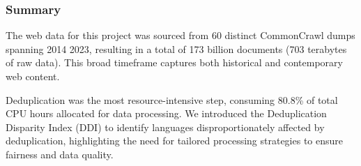 
\subsubsection{Summary} 
The web data for this project was sourced from 60 distinct CommonCrawl dumps spanning 2014 2023, resulting in a total of 173 billion documents (703 terabytes of raw data). This broad timeframe captures both historical and contemporary web content.

Deduplication was the most resource-intensive step, consuming 80.8\% of total CPU hours allocated for data processing. We introduced the Deduplication Disparity Index (DDI) to identify languages disproportionately affected by deduplication, highlighting the need for tailored processing strategies to ensure fairness and data quality. 

